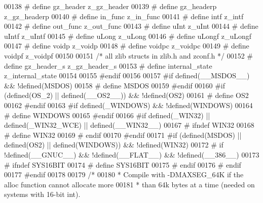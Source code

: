 \begin{DoxyCode}
00138 \textcolor{preprocessor}{#  define gz\_header             z\_gz\_header}
00139 \textcolor{preprocessor}{#  define gz\_headerp            z\_gz\_headerp}
00140 \textcolor{preprocessor}{#  define in\_func               z\_in\_func}
00141 \textcolor{preprocessor}{#  define intf                  z\_intf}
00142 \textcolor{preprocessor}{#  define out\_func              z\_out\_func}
00143 \textcolor{preprocessor}{#  define uInt                  z\_uInt}
00144 \textcolor{preprocessor}{#  define uIntf                 z\_uIntf}
00145 \textcolor{preprocessor}{#  define uLong                 z\_uLong}
00146 \textcolor{preprocessor}{#  define uLongf                z\_uLongf}
00147 \textcolor{preprocessor}{#  define voidp                 z\_voidp}
00148 \textcolor{preprocessor}{#  define voidpc                z\_voidpc}
00149 \textcolor{preprocessor}{#  define voidpf                z\_voidpf}
00150 
00151 \textcolor{comment}{/* all zlib structs in zlib.h and zconf.h */}
00152 \textcolor{preprocessor}{#  define gz\_header\_s           z\_gz\_header\_s}
00153 \textcolor{preprocessor}{#  define internal\_state        z\_internal\_state}
00154 
00155 \textcolor{preprocessor}{#endif}
00156 
00157 \textcolor{preprocessor}{#if defined(\_\_MSDOS\_\_) && !defined(MSDOS)}
00158 \textcolor{preprocessor}{#  define MSDOS}
00159 \textcolor{preprocessor}{#endif}
00160 \textcolor{preprocessor}{#if (defined(OS\_2) || defined(\_\_OS2\_\_)) && !defined(OS2)}
00161 \textcolor{preprocessor}{#  define OS2}
00162 \textcolor{preprocessor}{#endif}
00163 \textcolor{preprocessor}{#if defined(\_WINDOWS) && !defined(WINDOWS)}
00164 \textcolor{preprocessor}{#  define WINDOWS}
00165 \textcolor{preprocessor}{#endif}
00166 \textcolor{preprocessor}{#if defined(\_WIN32) || defined(\_WIN32\_WCE) || defined(\_\_WIN32\_\_)}
00167 \textcolor{preprocessor}{#  ifndef WIN32}
00168 \textcolor{preprocessor}{#    define WIN32}
00169 \textcolor{preprocessor}{#  endif}
00170 \textcolor{preprocessor}{#endif}
00171 \textcolor{preprocessor}{#if (defined(MSDOS) || defined(OS2) || defined(WINDOWS)) && !defined(WIN32)}
00172 \textcolor{preprocessor}{#  if !defined(\_\_GNUC\_\_) && !defined(\_\_FLAT\_\_) && !defined(\_\_386\_\_)}
00173 \textcolor{preprocessor}{#    ifndef SYS16BIT}
00174 \textcolor{preprocessor}{#      define SYS16BIT}
00175 \textcolor{preprocessor}{#    endif}
00176 \textcolor{preprocessor}{#  endif}
00177 \textcolor{preprocessor}{#endif}
00178 
00179 \textcolor{comment}{/*}
00180 \textcolor{comment}{ * Compile with -DMAXSEG\_64K if the alloc function cannot allocate more}
00181 \textcolor{comment}{ * than 64k bytes at a time (needed on systems with 16-bit int).}

\end{DoxyCode}
